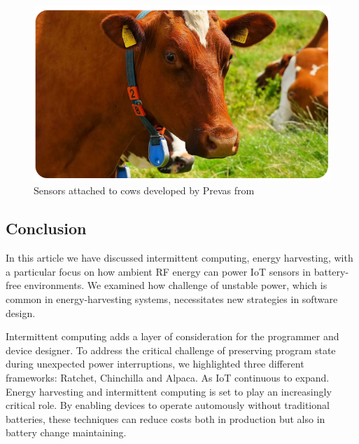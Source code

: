 \documentclass[article,a4paper]{IEEEtran}
\begin{document}
\begin{figure}
    \includegraphics[width=\columnwidth]{Cowsensors.png}
    \caption{ Sensors attached to cows developed by Prevas from \cite{RF_energy_harvest} }
    \label{fig6_cow_sensor}
\end{figure}
\subsection{Conclusion}
In this article we have discussed intermittent computing, energy harvesting, with a particular focus on how ambient RF energy can power IoT sensors in battery-free environments. We examined how challenge of unstable power, which is common in energy-harvesting systems, necessitates new strategies in software design. 

Intermittent computing adds a layer of consideration for the programmer and device designer. To address the critical challenge of preserving program state during unexpected power interruptions, we highlighted three different frameworks: Ratchet, Chinchilla and Alpaca. 
\newline\newline
As IoT continuous to expand. Energy harvesting and intermittent computing is set to play an increasingly critical role. By enabling devices to operate automously without traditional batteries, these techniques can reduce costs both in production but also in battery change maintaining.  
\printbibliography
\end{document}
